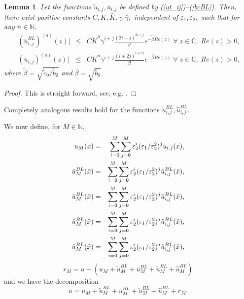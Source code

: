 \documentclass[12pt]{article}
\newtheorem{lemma}[theorem]{Lemma}
\begin{document}
\begin{lemma}
\label{lem:Dut_ij}
Let the functions $\tilde{u}_{i,j}, \bar{u}_{i,j}$ be defined by (\ref{ut_ij})--(\ref{bcBL}). Then, there exist
positive constants $C, \tilde{K}, \bar{K}, \tilde{\gamma}, \bar{\gamma},$ independent of $\varepsilon_1, \varepsilon_2,$ such that for any $n \in \mathbb{N},$
%
\begin{eqnarray*}
\vert \left(\tilde{u}^{BL}_{i,j}\right)^{(n)} (z) \vert &\leq& C \tilde{K}^n \tilde{\gamma}^{i+j} \frac{(2i+j)^{2i+j}}{i!} e^{-\tilde{\beta} Re(z)} \; \forall \; z \in \mathbb{C}, \; Re(z) > 0,\\
\vert \left(\bar{u}_{i,j}\right)^{(n)} (z) \vert &\leq& C \bar{K}^n \bar{\gamma}^{i+j} \frac{(i+2j)^{i+2j}}{j!} e^{-\bar{\beta} Re(z)} \; \forall \; z \in \mathbb{C}, \; Re(z) > 0,
\end{eqnarray*}
%
where $\tilde{\beta}=\sqrt{\tilde{c}_{0} / \tilde{b}_{0}}$ and $\bar{\beta}=\sqrt{\bar{b}_{0}}$.
\end{lemma}
\begin{proof}
This is straight forward, see, e.g. \cite[Corollary 6]{PCarXiv}.
\end{proof}

Completely analogous results hold for the functions $\check{u}^{BL}_{i,j}, \hat{u}^{BL}_{i,j}$.

We now define, for $M \in \mathbb{N}$,
%
\begin{eqnarray}
u_M(x) &=& \sum_{i=0}^{M} \sum_{j=0}^{M} \varepsilon_2^i (\varepsilon_1/ \varepsilon_2^2)^j u_{i,j}(x), \label{uM} \\
\tilde{u}_{M}^{BL} (\tilde{x}) &=& \sum_{i=0}^{M} \sum_{j=0}^{M} \varepsilon_2^i (\varepsilon_1/ \varepsilon_2^2)^j \tilde{u}^{BL}_{i,j}(\tilde{x}), \label{utM} \allowdisplaybreaks \\
\bar{u}_{M}^{BL} (\bar{x}) &=& \sum_{i=0}^{M} \sum_{j=0}^{M} \varepsilon_2^i (\varepsilon_1/ \varepsilon_2^2)^j \bar{u}^{BL}_{i,j}(\bar{x}), \label{ubM} \\
\check{u}_{M}^{BL} (\check{x}) &=& \sum_{i=0}^{M} \sum_{j=0}^{M} \varepsilon_2^i (\varepsilon_1/ \varepsilon_2^2)^j \check{u}^{BL}_{i,j}(\check{x}), \label{ucM} \\
\hat{u}_{M}^{BL} (\hat{x}) &=& \sum_{i=0}^{M} \sum_{j=0}^{M} \varepsilon_2^i (\varepsilon_1/ \varepsilon_2^2)^j \hat{u}^{BL}_{i,j}(\hat{x}), \label{uhM}
\end{eqnarray}%
\begin{equation}
r_M = u -\left( u_M + \tilde{u}_M^{BL} + \bar{u}_M^{BL} + \check{u}_M^{BL} + \hat{u}_M^{BL}\right) \label{rM}
\end{equation}%
and we have the decomposition
%
\begin{equation}
u = u_M + \tilde{u}_M^{BL} + \bar{u}_M^{BL} + \check{u}_M^{BL} + \hat{u}_M^{BL} + r_M. \label{decomp}
\end{equation}
\end{document}

